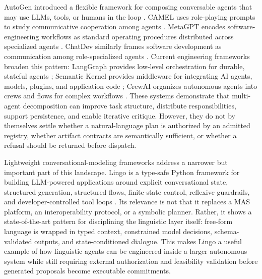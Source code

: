 AutoGen introduced a flexible framework for composing conversable agents that may use LLMs, tools, or humans in the loop \cite{wu2023autogen}. CAMEL uses role-playing prompts to study communicative cooperation among agents \cite{li2023camel}. MetaGPT encodes software-engineering workflows as standard operating procedures distributed across specialized agents \cite{hong2023metagpt}. ChatDev similarly frames software development as communication among role-specialized agents \cite{qian2023communicative}. Current engineering frameworks broaden this pattern: LangGraph provides low-level orchestration for durable, stateful agents \cite{langgraph2026}; Semantic Kernel provides middleware for integrating AI agents, models, plugins, and application code \cite{semantickernel2026}; CrewAI organizes autonomous agents into crews and flows for complex workflows \cite{crewai2026}. These systems demonstrate that multi-agent decomposition can improve task structure, distribute responsibilities, support persistence, and enable iterative critique. However, they do not by themselves settle whether a natural-language plan is authorized by an admitted registry, whether artifact contracts are semantically sufficient, or whether a refusal should be returned before dispatch.

Lightweight conversational-modeling frameworks address a narrower but important part of this landscape. Lingo is a type-safe Python framework for building LLM-powered applications around explicit conversational state, structured generation, structured flows, finite-state control, reflexive guardrails, and developer-controlled tool loops \cite{lingo2026}. Its relevance is not that it replaces a MAS platform, an interoperability protocol, or a symbolic planner. Rather, it shows a state-of-the-art pattern for disciplining the linguistic layer itself: free-form language is wrapped in typed context, constrained model decisions, schema-validated outputs, and state-conditioned dialogue. This makes Lingo a useful example of how linguistic agents can be engineered inside a larger autonomous system while still requiring external authorization and feasibility validation before generated proposals become executable commitments.

